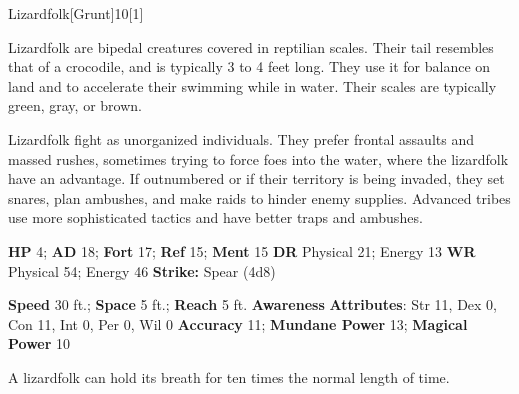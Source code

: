   \begin{monsection}{Lizardfolk}[Grunt]{10}[1]
    \vspace{-1em}\vspace{-1em}
    \vspace{0em}

    
    Lizardfolk are bipedal creatures covered in reptilian scales.
    Their tail resembles that of a crocodile, and is typically 3 to 4 feet long.
    They use it for balance on land and to accelerate their swimming while in water.
    Their scales are typically green, gray, or brown.

    Lizardfolk fight as unorganized individuals.
    They prefer frontal assaults and massed rushes, sometimes trying to force foes into the water, where the lizardfolk have an advantage.
    If outnumbered or if their territory is being invaded, they set snares, plan ambushes, and make raids to hinder enemy supplies.
    Advanced tribes use more sophisticated tactics and have better traps and ambushes.
  

    \begin{spellcontent}
      \begin{spelltargetinginfo}
        \pari \textbf{HP} 4;
          \textbf{AD} 18;
          \textbf{Fort} 17;
          \textbf{Ref} 15;
          \textbf{Ment} 15
        \pari \textbf{DR} Physical 21; Energy 13
        \pari \textbf{WR} Physical 54; Energy 46
        \pari \textbf{Strike:}
            Spear  (4d8)
      \end{spelltargetinginfo}
    \end{spellcontent}
    \begin{monsterfooter}
      \pari \textbf{Speed} 30 ft.;
        \textbf{Space} 5 ft.;
        \textbf{Reach} 5 ft.
      \pari \textbf{Awareness} 
      \pari \textbf{Attributes}:
        Str 11, Dex 0,
        Con 11, Int 0,
        Per 0, Wil 0
      \pari \textbf{Accuracy} 11;
        \textbf{Mundane Power} 13;
      \textbf{Magical Power} 10
    \end{monsterfooter}
  \end{monsection}
   A lizardfolk can hold its breath for ten times the normal length of time.
  
